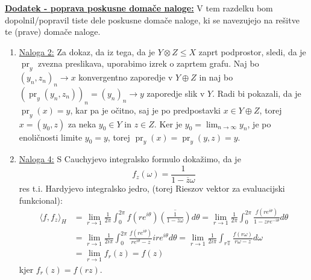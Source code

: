 \documentclass[a4paper, 12pt]{article}
\DeclareMathOperator{\pr}{pr}
\newcommand{\T}{\mathbb{T}}
\begin{document}
\underline{\textbf{Dodatek - poprava poskusne domače naloge:}}
V tem razdelku bom dopolnil/popravil tiste dele poskusne domače naloge,
ki se navezujejo na rešitve te (prave) domače naloge.
\begin{enumerate}[label=(\alph*)]
    \item \underline{Naloga 2:}
        Za dokaz, da iz tega, da je $Y \otimes Z \leq X$ zaprt podprostor,
        sledi, da je $\pr_y$ zvezna preslikava, uporabimo izrek o zaprtem grafu.
        Naj bo $(y_n, z_n)_n \to x$ konvergentno zaporedje v $Y \oplus Z$
        in naj bo $(\pr_y(y_n,z_n))_n = (y_n)_n \to y$ zaporedje slik v $Y$.
        Radi bi pokazali, da je $\pr_y(x) = y$, kar pa je očitno,
        saj je po predpostavki $x \in Y \oplus Z$, torej $x = (y_0, z)$ za neka $y_0 \in Y$ in $z \in Z$.
        Ker je $y_0 = \lim_{n\to\infty}y_n$, je po enoličnosti limite $y_0 = y$,
        torej $\pr_y(x) = \pr_y(y, z) = y$.
    \item \underline{Naloga 4:}
        S Cauchyjevo integralsko formulo dokažimo, da je
        \[
            f_z(\omega) = \frac{1}{1 - \overline{z}\omega}
        \]
        res t.i. Hardyjevo integralsko jedro,
        (torej Rieszov vektor za evaluacijski funkcional):
        \begin{align*}
            \langle f, f_z\rangle_H
            &= \lim_{r \to 1} \frac{1}{2\pi} \int_{0}^{2\pi} f(re^{i\theta}) \overline{\left(\frac{1}{1 - \overline{z}\omega}\right)} d\theta
            = \lim_{r \to 1} \frac{1}{2\pi} \int_{0}^{2\pi} \frac{f(re^{i\theta})}{1 - zre^{-i\theta}} d\theta \\
            &= \lim_{r \to 1} \frac{1}{2i\pi} \int_{0}^{2\pi} \frac{f(re^{i\theta})}{re^{i\theta} - z} ire^{i\theta}d\theta
            = \lim_{r \to 1} \frac{1}{2i\pi} \int_{r\T} \frac{f(r\omega)}{r\omega - z} d\omega \\
            &= \lim_{r \to 1} f_r(z) = f(z)
        \end{align*}
        kjer $f_r(z) = f(rz)$.
\end{enumerate}
\end{document}
